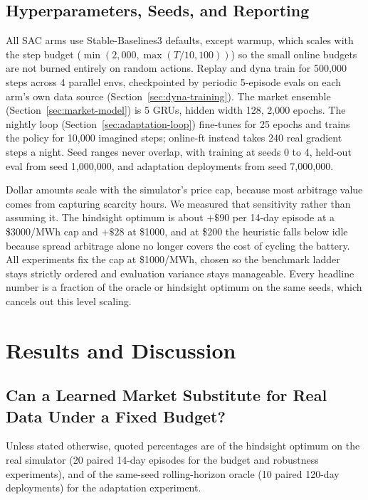 \documentclass[conference]{IEEEtran}
\begin{document}
\subsection{Hyperparameters, Seeds, and Reporting}
\label{sec:reporting}

All SAC arms use Stable-Baselines3 \citep{raffin2021sb3} defaults, except warmup, which scales with the step budget ($\min(2{,}000, \max(T/10, 100))$) so the small online budgets are not burned entirely on random actions. Replay and dyna train for 500{,}000 steps across 4 parallel envs, checkpointed by periodic 5-episode evals on each arm's own data source (Section~\ref{sec:dyna-training}). The market ensemble (Section~\ref{sec:market-model}) is 5 GRUs, hidden width 128, 2{,}000 epochs. The nightly loop (Section~\ref{sec:adaptation-loop}) fine-tunes for 25 epochs and trains the policy for 10{,}000 imagined steps; online-ft instead takes 240 real gradient steps a night. Seed ranges never overlap, with training at seeds 0 to 4, held-out eval from seed 1{,}000{,}000, and adaptation deployments from seed 7{,}000{,}000.

Dollar amounts scale with the simulator's price cap, because most arbitrage value comes from capturing scarcity hours. We measured that sensitivity rather than assuming it. The hindsight optimum is about $+\$90$ per 14-day episode at a \$3000/MWh cap and $+\$28$ at \$1000, and at \$200 the heuristic falls below idle because spread arbitrage alone no longer covers the cost of cycling the battery. All experiments fix the cap at \$1000/MWh, chosen so the benchmark ladder stays strictly ordered and evaluation variance stays manageable. Every headline number is a fraction of the oracle or hindsight optimum on the same seeds, which cancels out this level scaling.

\section{Results and Discussion}
\label{sec:results-discussion}

\subsection{Can a Learned Market Substitute for Real Data Under a Fixed Budget?}
\label{sec:results-budget}

Unless stated otherwise, quoted percentages are of the hindsight optimum on the real simulator (20 paired 14-day episodes for the budget and robustness experiments), and of the same-seed rolling-horizon oracle (10 paired 120-day deployments) for the adaptation experiment.
\end{document}
